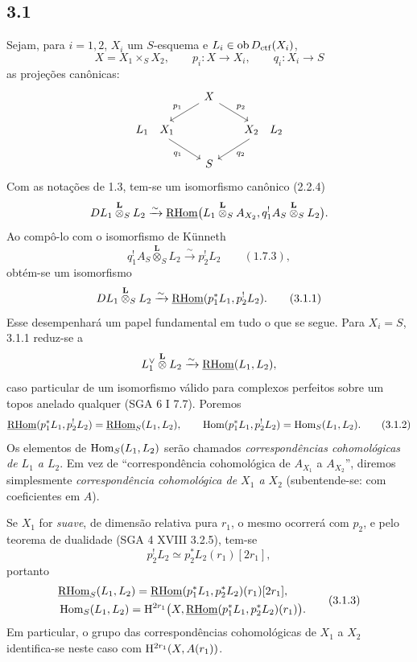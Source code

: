 \subsection*{3.1}
Sejam, para $i=1,2$, $X_i$ um $S$-esquema e $L_i\in\operatorname{ob}D_{\mathrm{ctf}}(X_i)$,
\[
X=X_1\times_S X_2,
\qquad
p_i:X\longrightarrow X_i,
\qquad
q_i:X_i\longrightarrow S
\]
as projeções canônicas:
\[
\begin{tikzcd}[column sep=1.8em,row sep=1.5em]
& X \arrow[dl,"p_1"'] \arrow[dr,"p_2"] & \\
L_1\quad X_1 \arrow[dr,"q_1"'] & & X_2\quad L_2 \arrow[dl,"q_2"] \\
& S &
\end{tikzcd}
\]
Com as notações de 1.3, tem-se um isomorfismo canônico (2.2.4)
\[
DL_1\overset{\mathbf L}{\otimes}_S L_2
\xrightarrow{\sim}
\underline{\mathrm{RHom}}\bigl(L_1\overset{\mathbf L}{\otimes}_S A_{X_2},
q_1^!A_S\overset{\mathbf L}{\otimes}_S L_2\bigr).
\]
Ao compô-lo com o isomorfismo de Künneth
\[
q_1^!A_S\overset{\mathbf L}{\otimes}_S L_2
\xrightarrow{\sim}p_2^!L_2 \qquad (1.7.3),
\]
obtém-se um isomorfismo
\begin{equation}
DL_1\overset{\mathbf L}{\otimes}_S L_2
\xrightarrow{\sim}
\underline{\mathrm{RHom}}(p_1^*L_1,p_2^!L_2).
\tag{3.1.1}
\end{equation}
Esse desempenhará um papel fundamental em tudo o que se segue. Para $X_i=S$, 3.1.1 reduz-se a
\[
L_1^\vee\overset{\mathbf L}{\otimes}L_2\xrightarrow{\sim}\underline{\mathrm{RHom}}(L_1,L_2),
\]
caso particular de um isomorfismo válido para complexos perfeitos sobre um topos anelado qualquer (SGA 6 I 7.7). Poremos
\begin{equation}
\underline{\mathrm{RHom}}(p_1^*L_1,p_2^!L_2)=\underline{\mathrm{RHom}}_S(L_1,L_2),
\qquad
\operatorname{Hom}(p_1^*L_1,p_2^!L_2)=\operatorname{Hom}_S(L_1,L_2).
\tag{3.1.2}
\end{equation}
Os elementos de $\operatorname{Hom}_S(L_1,L_2)$ serão chamados \emph{correspondências cohomológicas de $L_1$ a $L_2$}. Em vez de ``correspondência cohomológica de $A_{X_1}$ a $A_{X_2}$'', diremos simplesmente \emph{correspondência cohomológica de $X_1$ a $X_2$} (subentende-se: com coeficientes em $A$).

Se $X_1$ for \emph{suave}, de dimensão relativa pura $r_1$, o mesmo ocorrerá com $p_2$, e pelo teorema de dualidade (SGA 4 XVIII 3.2.5), tem-se
\[
p_2^!L_2\simeq p_2^*L_2(r_1)[2r_1],
\]
portanto
\begin{equation}
\begin{aligned}
&\underline{\mathrm{RHom}}_S(L_1,L_2)=\underline{\mathrm{RHom}}(p_1^*L_1,p_2^*L_2)(r_1)[2r_1],\\
&\operatorname{Hom}_S(L_1,L_2)=\mathrm{H}^{2r_1}\bigl(X,\underline{\mathrm{RHom}}(p_1^*L_1,p_2^*L_2)(r_1)\bigr).
\end{aligned}
\tag{3.1.3}
\end{equation}
Em particular, o grupo das correspondências cohomológicas de $X_1$ a $X_2$ identifica-se neste caso com $\mathrm{H}^{2r_1}(X,A(r_1))$.

